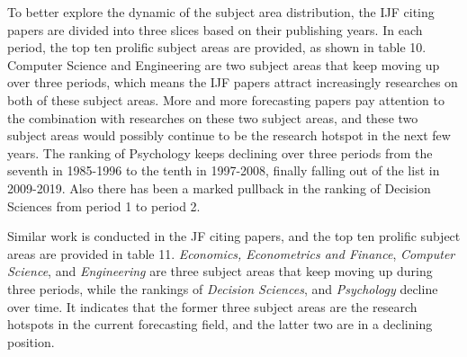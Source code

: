 \documentclass[11pt,a4paper]{elsarticle} %
\begin{document}
To better explore the dynamic of the subject area distribution, the IJF
citing papers are divided into three slices based on their publishing
years. In each period, the top ten prolific subject areas are provided,
as shown in table 10. Computer Science and Engineering are two subject
areas that keep moving up over three periods, which means the IJF papers
attract increasingly researches on both of these subject areas. More and
more forecasting papers pay attention to the combination with researches
on these two subject areas, and these two subject areas would possibly
continue to be the research hotspot in the next few years. The ranking
of Psychology keeps declining over three periods from the seventh in
1985-1996 to the tenth in 1997-2008, finally falling out of the list in
2009-2019. Also there has been a marked pullback in the ranking of
Decision Sciences from period 1 to period 2.

Similar work is conducted in the JF citing papers, and the top ten
prolific subject areas are provided in table 11. \emph{Economics,
Econometrics and Finance}, \emph{Computer Science}, and
\emph{Engineering} are three subject areas that keep moving up during
three periods, while the rankings of \emph{Decision Sciences}, and
\emph{Psychology} decline over time. It indicates that the former three
subject areas are the research hotspots in the current forecasting
field, and the latter two are in a declining position.

\newpage
\end{document}
